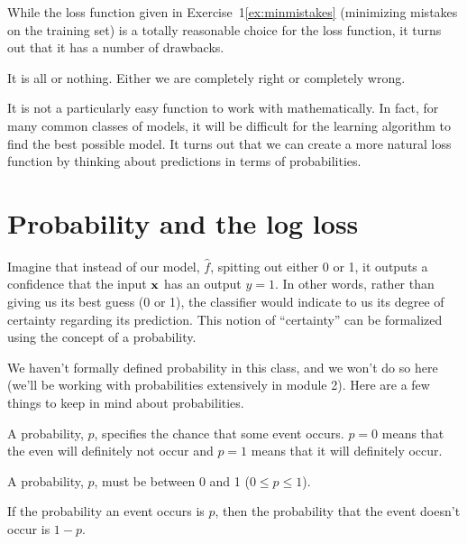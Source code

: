\documentclass[assignment03_Solutions]{subfiles}
\begin{document}
While the loss function given in Exercise~1\ref{ex:minmistakes} (minimizing mistakes on the training set) is a totally reasonable choice for the loss function, it turns out that it has a number of drawbacks.
\bi
\item It is all or nothing.  Either we are completely right or completely wrong.
\item It is not a particularly easy function to work with mathematically.  In fact, for many common classes of models, it will be difficult for the learning algorithm to find the best possible model.
\ei
It turns out that we can create a more natural loss function by thinking about predictions in terms of probabilities.

\section{Probability and the log loss}
Imagine that instead of our model, $\hat{f}$, spitting out either 0 or 1, it outputs a confidence that the input $\mathbf{x}$ has an output $y= 1$.  In other words, rather than giving us its best guess (0 or 1), the classifier would indicate to us its degree of certainty regarding its prediction.  This notion of ``certainty'' can be formalized using the concept of a probability. %

We haven't formally defined probability in this class, and we won't do so here (we'll be working with probabilities extensively in module 2).  Here are a few things to keep in mind about probabilities.
\bi
\item A probability, $p$, specifies the chance that some event occurs.  $p = 0$ means that the even will definitely not occur and $p=1$ means that it will definitely occur.
\item A probability, $p$, must be between 0 and 1 ($0 \leq p \leq 1$).
\item If the probability an event occurs is $p$, then the probability that the event doesn't occur is $1 - p$.
\ei
\end{document}
